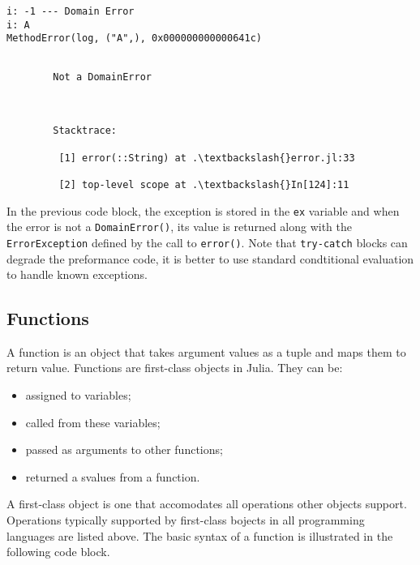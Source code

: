 \documentclass[11pt]{article}
\providecommand{\tightlist}{%
      \setlength{\itemsep}{0pt}\setlength{\parskip}{0pt}}
\begin{document}
    \begin{Verbatim}[commandchars=\\\{\}]
i: -1 --- Domain Error
i: A
MethodError(log, ("A",), 0x000000000000641c)

    \end{Verbatim}

    \begin{Verbatim}[commandchars=\\\{\}]

        Not a DomainError

        

        Stacktrace:

         [1] error(::String) at .\textbackslash{}error.jl:33

         [2] top-level scope at .\textbackslash{}In[124]:11

    \end{Verbatim}

    In the previous code block, the exception is stored in the \texttt{ex}
variable and when the error is not a \texttt{DomainError()}, its value
is returned along with the \texttt{ErrorException} defined by the call
to \texttt{error()}. Note that \texttt{try-catch} blocks can degrade the
preformance code, it is better to use standard condtitional evaluation
to handle known exceptions.

    \hypertarget{functions}{%
\subsection{Functions}\label{functions}}

A function is an object that takes argument values as a tuple and maps
them to return value. Functions are first-class objects in Julia. They
can be:

\begin{itemize}
\tightlist
\item
  assigned to variables;
\item
  called from these variables;
\item
  passed as arguments to other functions;
\item
  returned a svalues from a function.
\end{itemize}

A first-class object is one that accomodates all operations other
objects support. Operations typically supported by first-class bojects
in all programming languages are listed above. The basic syntax of a
function is illustrated in the following code block.
\end{document}
